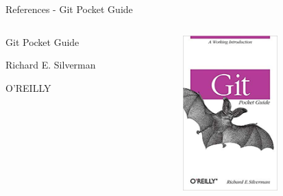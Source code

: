 \documentclass[table,svgnames,aspectratio=169]{beamer}
\begin{document}
\begin{frame}[label={sec:orgf4fc788}]{References - Git Pocket Guide}
\begin{columns}
\begin{column}{.5\columnwidth}
Git Pocket Guide

Richard E. Silverman 

O'REILLY 
\end{column}

\begin{column}{.5\columnwidth}
\begin{center}
\includegraphics[height=6cm]{graphics/pocket.jpg}
\end{center}
\end{column}
\end{columns}
\end{frame}
\end{document}
